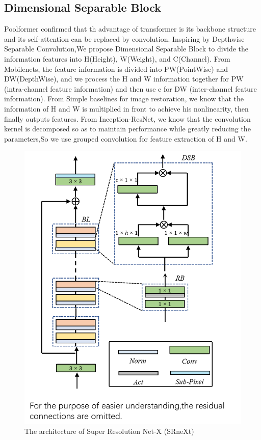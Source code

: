 \documentclass[10pt,twocolumn,letterpaper]{article}
\begin{document}
\subsection{Dimensional Separable Block}
Poolformer\cite{ref5} confirmed that th advantage of transformer is its backbone structure and its self-attention can be replaced by convolution.
Inspiring by Depthwise Separable Convolution\cite{ref6},We propose Dimensional Separable Block to divide the information features into H(Height), W(Weight), and C(Channel). 
From Mobilenets,\cite{ref7} the feature information is divided into PW(PointWise) and DW(DepthWise), and we process the H and W information together for PW (intra-channel feature information) and then use c for DW (inter-channel feature information). From Simple baselines for image restoration\cite{ref8}, we know that the information of H and W is multiplied in front to achieve his nonlinearity, then finally outputs features. From Inception-ResNet\cite{ref9}, we know that the convolution kernel is decomposed so as to maintain performance while greatly reducing the parameters,So we use grouped convolution for feature extraction of H and W.




\begin{figure}
	\centering
	\includegraphics[width=1.0\linewidth]{competition_picture1}
	\caption{The architecture of Super Resolution Net-X (SRneXt)}
	\label{fig:competitionpicture1}
\end{figure}
\end{document}
